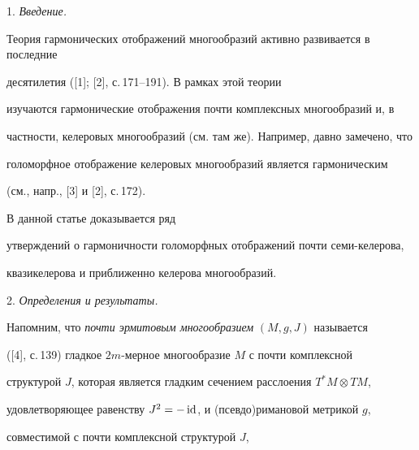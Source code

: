 \date{}




\pagestyle{plain} %







\maketitle


\label{begin}








1. {\it Введение.}


Теория гармонических отображений многообразий активно развивается в последние


десятилетия ([1]; [2], с.\,171--191). В рамках этой теории


изучаются гармонические отображения почти комплексных многообразий и, в


частности, келеровых многообразий (см. там же). Например, давно замечено, что


голоморфное отображение келеровых многообразий является гармоническим


(см., напр., [3] и [2], с.\,172).





В данной статье доказывается ряд


утверждений о гармоничности голоморфных отображений почти семи-келерова,


квазикелерова и приближенно келерова многообразий.


\medskip





2. {\it Определения и результаты.}


Напомним, что {\it почти эрмитовым многообразием} $(M,g,J)$ называется


([4], с.\,139) гладкое $2m$-мерное многообразие $M$ с почти комплексной


структурой $J$, которая является гладким сечением расслоения $T^*M\otimes TM$,


удовлетворяющее равенству $J^2=-\operatorname{id}$, и (псевдо)римановой метрикой $g$,


совместимой с почти комплексной структурой $J$,



